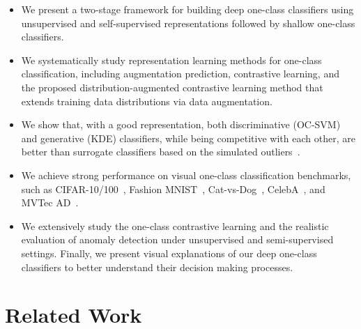 \documentclass{article} \usepackage{iclr2021_conference,times}
\begin{document}
\begin{itemize}[leftmargin=0.6cm,itemsep=0pt]
    \item We present a two-stage framework for building deep one-class classifiers using unsupervised and self-supervised representations followed by shallow one-class classifiers. \item We systematically study representation learning methods for one-class classification, including augmentation prediction, contrastive learning, and the proposed distribution-augmented contrastive learning method that extends training data distributions via data augmentation.
    \item We show that, with a good representation, both discriminative (OC-SVM) and generative (KDE) classifiers, while being competitive with each other, are better than surrogate classifiers based on the simulated outliers~\citep{golan2018deep,hendrycks2019using}.
    \item We achieve strong performance on visual one-class classification benchmarks, such as CIFAR-10/100~\citep{krizhevsky2009learning}, Fashion MNIST~\citep{xiao2017fashion}, Cat-vs-Dog~\citep{elson2007asirra}, CelebA~\citep{liu2015deep}, and MVTec AD~\citep{bergmann2019mvtec}. 
    \item We extensively study the one-class contrastive learning and the realistic evaluation of anomaly detection under unsupervised and semi-supervised settings. Finally, we present visual explanations of our deep one-class classifiers to better understand their decision making processes.
\end{itemize}


\iffalse
{\color{red}TODO

Merge section 3 and 4

before subsection: explain the framework briefly, and explain what we are going to explain for each section

first subsection: learning representation by (1) rotation prediction and geometry prediction in anomaly detection. Good representation but problematic reuse of classifiers (2) contrastive loss and the problem and the fix

second subsection: construct detector

third subsection: how to use assembled one-class classifier for visual explanation

}
\fi

\vspace{-0.05in}
\section{Related Work}
\label{sec:related}
\vspace{-0.05in}
\end{document}
